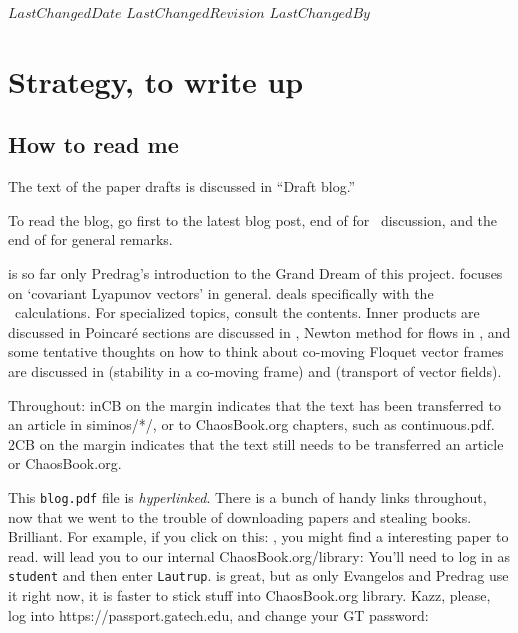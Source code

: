 \ifsvnmulti
 {$LastChangedDate$}
 {$LastChangedRevision$} {$LastChangedBy$}
\fi

\chapter{Strategy, to write up}

\section{How to read me}

The text of the paper drafts is discussed in 
``Draft blog.''

To read the blog, go first to the latest blog post, end
of  for \KS\ discussion, and the end
of  for general remarks.

 is so far only Predrag's introduction to the Grand
Dream of this project.  focuses on `covariant
Lyapunov vectors' in general.  deals specifically
with the \KS\ calculations.
For specialized topics, consult the contents. Inner products are
discussed in  Poincar\'e sections are discussed
in , Newton method for flows in
, and some tentative thoughts on how to think about
co-moving Floquet vector frames are discussed in
 (stability in a co-moving frame) and
 (transport of vector fields).

Throughout:  {\footnotesize inCB} on the margin                 \inCB
indicates that the text has been transferred to an
article in siminos/*/,  or to ChaosBook.org
chapters, such as
{continuous.pdf}.
 {\footnotesize 2CB} on the margin indicates that the text
still needs to be transferred an article or ChaosBook.org.      \toCB

This \texttt{blog.pdf} file is \emph{hyperlinked}.
There is a bunch of handy links throughout,
now that we went to the trouble of downloading papers and stealing books. Brilliant.
For example, if you click on
this: , you might find a interesting paper to read.
 will
lead you to our internal ChaosBook.org/library:
You'll need to log in as \texttt{student} and then enter \texttt{Lautrup}.
 is great,
but as only Evangelos and Predrag use it right now,
it is faster to stick stuff into ChaosBook.org library.
%
Kazz, please, log into https://passport.gatech.edu, and change your GT password:

